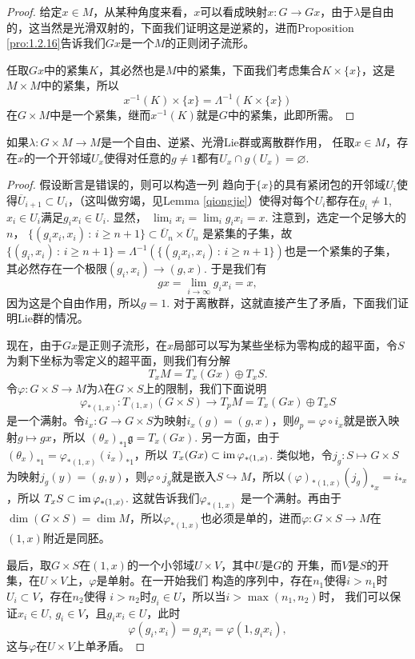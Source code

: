 \begin{proof}
	给定$x\in M$，从某种角度来看，$x$可以看成映射$x:G\to Gx$，由于$\lambda$是自由的，这当然是光滑双射的，下面我们证明这是逆紧的，进而Proposition \ref{pro:1.2.16}告诉我们$Gx$是一个$M$的正则闭子流形。

	任取$Gx$中的紧集$K$，其必然也是$M$中的紧集，下面我们考虑集合$K\times \{x\}$，这是$M\times M$中的紧集，所以
	\[
		x^{-1}(K)\times \{x\}=\Lambda^{-1}(K\times \{x\})
	\]
	在$G\times M$中是一个紧集，继而$x^{-1}(K)$就是$G$中的紧集，此即所需。
\end{proof}

\begin{lem}\label{lem:1.4.19}
	如果$\lambda:G\times M\to M$是一个自由、逆紧、光滑Lie群或离散群作用，
	任取$x \in M$，存在$x$的一个开邻域$U_x$使得对任意的$g\neq 1$都有$U_x\cap g(U_x)=\varnothing$.
\end{lem}

\begin{proof}
	假设断言是错误的，则可以构造一列
	趋向于$\{x\}$的具有紧闭包的开邻域$U_i$使得$\overline{U}_{i+1}\subset U_i$，（这叫做穷竭，见Lemma \ref{qiongjie}）使得对每个$U_i$都存在$g_i\neq 1$, $x_i\in U_i$满足$g_ix_i\in U_i$. 显然， 
	$\lim_i x_i=\lim_i g_ix_i=x$.
	注意到，选定一个足够大的$n$，
	$\{(g_ix_i,x_i)\,:\,i\geq n+1\}\subset \overline{U}_{n}\times \overline{U}_{n}$
	是紧集的子集，故$\{(g_i,x_i)\,:\,i\geq n+1\}=\Lambda^{-1}(\{(g_ix_i,x_i)\,:\,i\geq n+1\})$也是一个紧集的子集，
	其必然存在一个极限$(g_i,x_i)\to (g,x)$. 于是我们有
	\[
		gx=\lim_{i\to \infty}g_ix_i=x,
	\]
	因为这是个自由作用，所以$g=1$. 对于离散群，这就直接产生了矛盾，下面我们证明Lie群的情况。

	现在，由于$Gx$是正则子流形，在$x$局部可以写为某些坐标为零构成的超平面，令$S$为剩下坐标为零定义的超平面，则我们有分解
	\[
		T_xM=T_x(Gx)\oplus T_xS.
	\]
	令$\varphi:G\times S\to M$为$\lambda$在$G\times S$上的限制，我们下面说明
	\[
		\varphi_{*(1,x)}:T_{(1,x)}(G\times S)\to T_pM=T_x(Gx)\oplus T_xS
	\]
	是一个满射。令$i_x:G\to G\times S$为映射$i_x(g)=(g,x)$，则$\theta_p=\varphi\circ i_x$就是嵌入映射$g\mapsto gx$，所以
	$(\theta_x)_{*1}\mathfrak g=T_x(Gx)$. 另一方面，由于
	$(\theta_x)_{*1}=\varphi_{*(1,x)}(i_x)_{*1}$，所以
	$T_x(Gx)\subset \operatorname{im} \varphi_{*(1,x)}$. 类似地，令$j_g:S\mapsto G\times S$为映射$j_g(y)=(g,y)$，则$\varphi\circ j_g$就是嵌入$S\hookrightarrow M$，所以$(\varphi)_{*(1,x)}(j_g)_{*x}=i_{*x}$，所以
	$T_xS\subset \operatorname{im} \varphi_{*(1,x)}$. 这就告诉我们$\varphi_{*(1,x)}$
	是一个满射。再由于$\dim (G\times S)=\dim M$，所以$\varphi_{*(1,x)}$也必须是单的，进而$\varphi:G\times S\to M$在$(1,x)$附近是同胚。

	最后，取$G\times S$在$(1,x)$的一个小邻域$U\times V$，其中$U$是$G$的
	开集，而$V$是$S$的开集，在$U\times V$上，$\varphi$是单射。在一开始我们
	构造的序列中，存在$n_1$使得$i>n_1$时$U_i\subset V$，存在$n_2$使得
	$i>n_2$时$g_i\in U$，所以当$i>\max(n_1,n_2)$时，
	我们可以保证$x_i\in U$, $g_i\in V$，且$g_ix_i\in U$，此时
	\[
		\varphi(g_i,x_i)=g_ix_i=\varphi(1,g_ix_i),
	\]
	这与$\varphi$在$U\times V$上单矛盾。
\end{proof}

